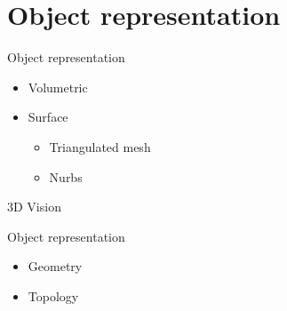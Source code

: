 
\section{Object representation}
\begin{frame}{Object representation}
\begin{itemize}
    \item Volumetric
    \item Surface
    \begin{itemize}
        \item Triangulated mesh
        \item Nurbs
    \end{itemize}
\end{itemize}

\end{frame}

\begin{frame}[t,allowframebreaks]{3D Vision}
    \tableofcontents
    
\end{frame}

\begin{frame}{Object representation}
\begin{itemize}
    \item Geometry
    \item Topology
\end{itemize}
\end{frame}

